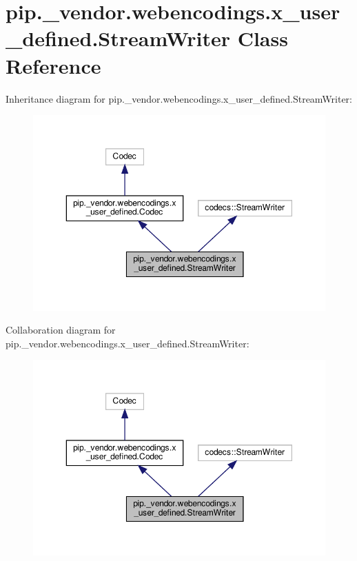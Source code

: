 \hypertarget{classpip_1_1__vendor_1_1webencodings_1_1x__user__defined_1_1StreamWriter}{}\section{pip.\+\_\+vendor.\+webencodings.\+x\+\_\+user\+\_\+defined.\+Stream\+Writer Class Reference}
\label{classpip_1_1__vendor_1_1webencodings_1_1x__user__defined_1_1StreamWriter}


Inheritance diagram for pip.\+\_\+vendor.\+webencodings.\+x\+\_\+user\+\_\+defined.\+Stream\+Writer\+:
\nopagebreak
\begin{figure}[H]
\begin{center}
\leavevmode
\includegraphics[width=350pt]{classpip_1_1__vendor_1_1webencodings_1_1x__user__defined_1_1StreamWriter__inherit__graph}
\end{center}
\end{figure}


Collaboration diagram for pip.\+\_\+vendor.\+webencodings.\+x\+\_\+user\+\_\+defined.\+Stream\+Writer\+:
\nopagebreak
\begin{figure}[H]
\begin{center}
\leavevmode
\includegraphics[width=350pt]{classpip_1_1__vendor_1_1webencodings_1_1x__user__defined_1_1StreamWriter__coll__graph}
\end{center}
\end{figure}
